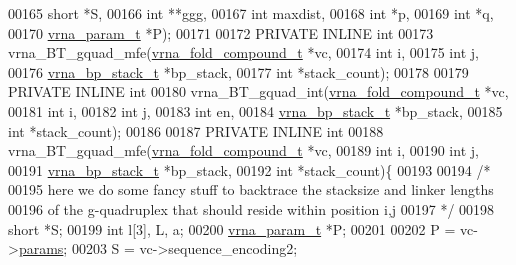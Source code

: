 \begin{DoxyCode}
00165                                               \textcolor{keywordtype}{short} *S,
00166                                               \textcolor{keywordtype}{int} **ggg,
00167                                               \textcolor{keywordtype}{int} maxdist,
00168                                               \textcolor{keywordtype}{int} *p,
00169                                               \textcolor{keywordtype}{int} *q,
00170                                               \hyperlink{group__energy__parameters_structvrna__param__s}{vrna\_param\_t} *P);
00171 
00172 PRIVATE INLINE \textcolor{keywordtype}{int}
00173 vrna\_BT\_gquad\_mfe(\hyperlink{group__fold__compound_structvrna__fc__s}{vrna\_fold\_compound\_t} *vc,
00174                   \textcolor{keywordtype}{int} i,
00175                   \textcolor{keywordtype}{int} j,
00176                   \hyperlink{group__data__structures_structvrna__bp__stack__s}{vrna\_bp\_stack\_t} *bp\_stack,
00177                   \textcolor{keywordtype}{int} *stack\_count);
00178 
00179 PRIVATE INLINE \textcolor{keywordtype}{int}
00180 vrna\_BT\_gquad\_int(\hyperlink{group__fold__compound_structvrna__fc__s}{vrna\_fold\_compound\_t} *vc,
00181                   \textcolor{keywordtype}{int} i,
00182                   \textcolor{keywordtype}{int} j,
00183                   \textcolor{keywordtype}{int} en,
00184                   \hyperlink{group__data__structures_structvrna__bp__stack__s}{vrna\_bp\_stack\_t} *bp\_stack,
00185                   \textcolor{keywordtype}{int} *stack\_count);
00186 
00187 PRIVATE INLINE \textcolor{keywordtype}{int}
00188 vrna\_BT\_gquad\_mfe(\hyperlink{group__fold__compound_structvrna__fc__s}{vrna\_fold\_compound\_t} *vc,
00189                   \textcolor{keywordtype}{int} i,
00190                   \textcolor{keywordtype}{int} j,
00191                   \hyperlink{group__data__structures_structvrna__bp__stack__s}{vrna\_bp\_stack\_t} *bp\_stack,
00192                   \textcolor{keywordtype}{int} *stack\_count)\{
00193 
00194   \textcolor{comment}{/*}
00195 \textcolor{comment}{    here we do some fancy stuff to backtrace the stacksize and linker lengths}
00196 \textcolor{comment}{    of the g-quadruplex that should reside within position i,j}
00197 \textcolor{comment}{  */}
00198   \textcolor{keywordtype}{short}         *S;
00199   \textcolor{keywordtype}{int}           l[3], L, a;
00200   \hyperlink{group__energy__parameters_structvrna__param__s}{vrna\_param\_t}  *P;
00201 
00202   P = vc->\hyperlink{group__fold__compound_a19b8720c2c5321c1b97c830bd17566ea}{params};
00203   S = vc->sequence\_encoding2;

\end{DoxyCode}
